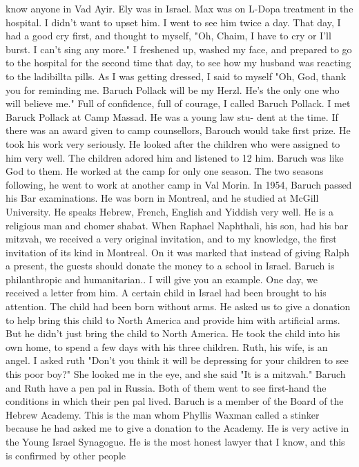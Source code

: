 know anyone in Vad Ayir.
Ely was in Israel.
Max was on L-Dopa 
treatment in the hospital.
I didn't want to upset him.
I went to 
see him twice a day.
That day, I had a good cry first, and 
thought to myself, "Oh, Chaim, I have to cry or I'll burst.
I can't 
sing any more."
I freshened up, washed my face, and prepared to go to the hospital for the second time that day, to see how my husband was reacting to the ladibillta pills.
As I was getting dressed, I said to 
myself "Oh, God, thank you for reminding me.
Baruch Pollack will be 
my Herzl.
He's the only one who will believe me."
Full of confidence, 
full of courage, I called Baruch Pollack.
I met Baruck Pollack at Camp Massad.
He was a young law stu-
dent at the time.
If there was an award given to camp counsellors, 
Barouch would take first prize.
He took his work very seriously.
He looked after the children who were assigned to him very well.
The 
children adored him and listened to 12 him.
Baruch was like God to 
them.
He worked at the camp for only one season.
The two seasons 
following, he went to work at another camp in Val Morin.
In 1954, 
Baruch passed his Bar examinations.
He was born in Montreal, and he studied at McGill University.
He speaks Hebrew, French, English and Yiddish very well.
He is a 
religious man and chomer shabat.
When Raphael Naphthali, his son, 
had his bar mitzvah, we received a very original invitation, and 
to my knowledge, the first invitation of its kind in Montreal.
On 
it was marked that instead of giving Ralph a present, the guests 
should donate the money to a school in Israel.
Baruch is philanthropic and humanitarian.. I will give you an 
example.
One day, we received a letter from him.
A certain child 
in Israel had been brought to his attention.
The child had been 
born without arms.
He asked us to give a donation to help bring this 
child to North America and provide him with artificial arms.
But 
he didn't just bring the child to North America.
He took the child 
into his own home, to spend a few days with his three children.
Ruth, 
his wife, is an angel.
I asked ruth "Don't you think it will be depressing for your children to see this poor boy?"
She looked me 
in the eye, and she said "It is a mitzvah."
Baruch and Ruth have a 
pen pal in Russia.
Both of them went to see first-hand the conditions in which their pen pal lived.
Baruch is a member of the 
Board of the Hebrew Academy.
This is the man whom Phyllis Waxman 
called a stinker because he had asked me to give a donation to the 
Academy.
He is very active in the Young Israel Synagogue.
He is the 
most honest lawyer that I know, and this is confirmed by other people 
